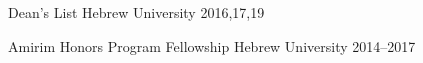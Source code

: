 \begin{cvhonors}

  \cvhonor
    {Dean’s List} %
    {Hebrew University} %
    {} %
    {2016,17,19} %

   \cvhonor
     {Amirim Honors Program Fellowship} %
     {Hebrew University} %
     {} %
     {2014--2017} %






\end{cvhonors}